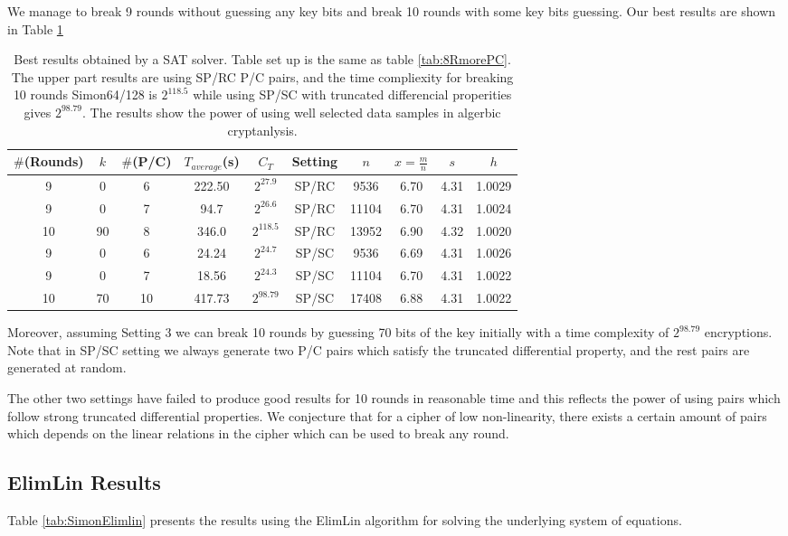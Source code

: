We manage to break 9 rounds without guessing any key bits and break 10 rounds with some key bits guessing. Our best results are shown in Table \ref{tab:10RmorePC}

\begin{table}[!hh]
	\caption[Best results obtained by a SAT solver]{Best results obtained by a SAT solver. Table set up is the same as table \ref{tab:8RmorePC}. The upper part results are using SP/RC P/C pairs, and the time compliexity for breaking 10 rounds Simon64/128 is $2^{118.5}$ while using SP/SC with truncated differencial properities gives $2^{98.79}$. The results show the power of using well selected data samples in algerbic cryptanlysis. }\label{tab:10RmorePC} \centering
	\begin{tabular}{|c|c|c|c|c|c|c|c|c|c|}
		\hline
		$\#$(Rounds) & $k$ & $\#$(P/C) & $T_{average}$(s) & $C_T$ & Setting & $n$ & $x=\frac{m}{n}$ & $s$ & $h$ \\
		\hline
		9 & 0 & 6 & 222.50   & $2^{27.9}$ & SP/RC & 9536	& 6.70	& 4.31	& 1.0029 \\
		9 & 0 & 7 & 94.7   & $2^{26.6}$ & SP/RC & 11104	& 6.70	& 4.31	& 1.0024 \\
		10 & 90 & 8 & 346.0   & $2^{118.5}$ & SP/RC & 13952	& 6.90	& 4.32	& 1.0020 \\
		\hline
		9 & 0  & 6 & 24.24   & $2^{24.7}$ & SP/SC  & 9536	& 6.69	& 4.31	& 1.0026  \\
		9 & 0  & 7 & 18.56   & $2^{24.3}$ & SP/SC  & 11104	& 6.70	& 4.31	& 1.0022  \\
		10 & 70  & 10 & 417.73   & $2^{98.79}$ & SP/SC  & 17408	& 6.88	& 4.31	& 1.0022  \\
		\hline
	\end{tabular}
\end{table}

Moreover, assuming Setting 3 we can break 10 rounds by
guessing 70 bits of the key initially with a time complexity of $2^{98.79}$ encryptions.
Note that in SP/SC setting we always generate two P/C pairs which satisfy the truncated differential property, and the rest pairs are generated at random.

The other two settings have failed to produce good results for 10 rounds in reasonable time
and this reflects the power of using pairs which follow strong truncated differential properties. We conjecture that for a cipher of low non-linearity, there exists a certain amount of pairs which depends on the linear relations in the cipher which can be used to break any round.
\subsection{ElimLin Results}
Table \ref{tab:SimonElimlin} presents the results using the ElimLin algorithm for solving the
underlying system of equations.


